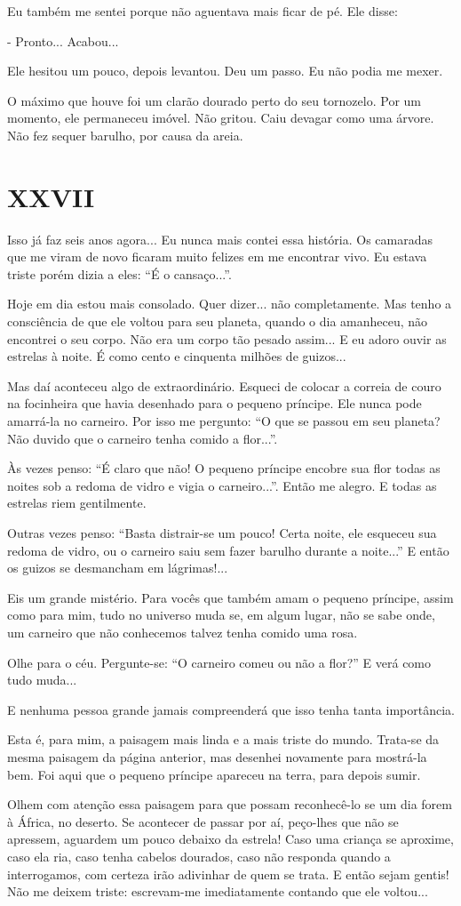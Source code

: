 Eu também me sentei porque não aguentava mais ficar de pé. Ele disse:

- Pronto... Acabou...

Ele hesitou um pouco, depois levantou. Deu um passo. Eu não podia me
mexer.

O máximo que houve foi um clarão dourado perto do seu tornozelo. Por um
momento, ele permaneceu imóvel. Não gritou. Caiu devagar como uma
árvore. Não fez sequer barulho, por causa da areia.

\chapter{XXVII}

Isso já faz seis anos agora... Eu nunca mais contei essa história. Os
camaradas que me viram de novo ficaram muito felizes em me encontrar
vivo. Eu estava triste porém dizia a eles: ``É o cansaço...''.

Hoje em dia estou mais consolado. Quer dizer... não completamente. Mas
tenho a consciência de que ele voltou para seu planeta, quando o dia
amanheceu, não encontrei o seu corpo. Não era um corpo tão pesado
assim... E eu adoro ouvir as estrelas à noite. É como cento e cinquenta
milhões de guizos...

Mas daí aconteceu algo de extraordinário. Esqueci de colocar a correia
de couro na focinheira que havia desenhado para o pequeno príncipe. Ele
nunca pode amarrá-la no carneiro. Por isso me pergunto: ``O que se
passou em seu planeta? Não duvido que o carneiro tenha comido a
flor...''.

Às vezes penso: ``É claro que não! O pequeno príncipe encobre sua flor
todas as noites sob a redoma de vidro e vigia o carneiro...''. Então me
alegro. E todas as estrelas riem gentilmente.

Outras vezes penso: ``Basta distrair-se um pouco! Certa noite, ele
esqueceu sua redoma de vidro, ou o carneiro saiu sem fazer barulho
durante a noite...'' E então os guizos se desmancham em lágrimas!...

Eis um grande mistério. Para vocês que também amam o pequeno príncipe,
assim como para mim, tudo no universo muda se, em algum lugar, não se
sabe onde, um carneiro que não conhecemos talvez tenha comido uma rosa.

Olhe para o céu. Pergunte-se: ``O carneiro comeu ou não a flor?'' E verá
como tudo muda...

E nenhuma pessoa grande jamais compreenderá que isso tenha tanta
importância.

Esta é, para mim, a paisagem mais linda e a mais triste do mundo.
Trata-se da mesma paisagem da página anterior, mas desenhei novamente
para mostrá-la bem. Foi aqui que o pequeno príncipe apareceu na terra,
para depois sumir.

Olhem com atenção essa paisagem para que possam reconhecê-lo se um dia
forem à África, no deserto. Se acontecer de passar por aí, peço-lhes que
não se apressem, aguardem um pouco debaixo da estrela! Caso uma criança
se aproxime, caso ela ria, caso tenha cabelos dourados, caso não
responda quando a interrogamos, com certeza irão adivinhar de quem se
trata. E então sejam gentis! Não me deixem triste: escrevam-me
imediatamente contando que ele voltou...
